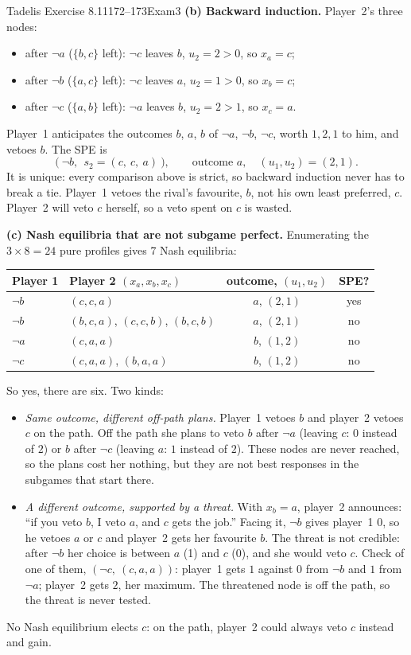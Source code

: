\begin{exsol}{Tadelis Exercise 8.11}{172--173}{Exam}{3}
\textbf{(b) Backward induction.} Player~2's three nodes:
\begin{itemize}
  \item after $\neg a$ ($\{b,c\}$ left): $\neg c$ leaves $b$, $u_2 = 2 > 0$, so $x_a = c$;
  \item after $\neg b$ ($\{a,c\}$ left): $\neg c$ leaves $a$, $u_2 = 1 > 0$, so $x_b = c$;
  \item after $\neg c$ ($\{a,b\}$ left): $\neg a$ leaves $b$, $u_2 = 2 > 1$, so $x_c = a$.
\end{itemize}
Player~1 anticipates the outcomes $b$, $a$, $b$ of $\neg a$, $\neg b$, $\neg c$, worth $1, 2, 1$ to
him, and vetoes $b$. The SPE is
\[
  \bigl(\ \neg b,\ \ s_2 = (c,\ c,\ a)\ \bigr), \qquad \text{outcome } a, \quad (u_1,u_2) = (2,1).
\]
It is unique: every comparison above is strict, so backward induction never has to break a tie. Player~1 vetoes
the rival's favourite, $b$, not his own least preferred, $c$. Player~2 will veto $c$ herself, so a veto
spent on $c$ is wasted.

\textbf{(c) Nash equilibria that are not subgame perfect.} Enumerating the $3 \times 8 = 24$ pure
profiles gives 7 Nash equilibria:
\begin{center}
\begin{tabular}{llcc}
\toprule
Player 1 & Player 2 $(x_a, x_b, x_c)$ & outcome, $(u_1,u_2)$ & SPE? \\
\midrule
$\neg b$ & $(c, c, a)$ & $a$, $(2,1)$ & yes \\
$\neg b$ & $(b, c, a)$, $(c, c, b)$, $(b, c, b)$ & $a$, $(2,1)$ & no \\
$\neg a$ & $(c, a, a)$ & $b$, $(1,2)$ & no \\
$\neg c$ & $(c, a, a)$, $(b, a, a)$ & $b$, $(1,2)$ & no \\
\bottomrule
\end{tabular}
\end{center}
So yes, there are six. Two kinds:
\begin{itemize}
  \item \emph{Same outcome, different off-path plans.} Player~1 vetoes $b$ and player~2 vetoes $c$ on
  the path. Off the path she plans to veto $b$ after $\neg a$ (leaving $c$: $0$ instead of $2$) or $b$
  after $\neg c$ (leaving $a$: $1$ instead of $2$). These nodes are never reached, so the plans cost
  her nothing, but they are not best responses in the subgames that start there.
  \item \emph{A different outcome, supported by a threat.} With $x_b = a$, player~2 announces: ``if
  you veto $b$, I veto $a$, and $c$ gets the job.'' Facing it, $\neg b$ gives player~1 $0$, so he
  vetoes $a$ or $c$ and player~2 gets her favourite $b$. The threat is not credible: after $\neg b$
  her choice is between $a$ (1) and $c$ (0), and she would veto $c$. Check of one of them,
  $(\neg c,\ (c,a,a))$: player~1 gets $1$ against $0$ from $\neg b$ and $1$ from $\neg a$;
  player~2 gets $2$, her maximum. The threatened node is off the path, so the threat is never
  tested.
\end{itemize}
No Nash equilibrium elects $c$: on the path, player~2 could always veto $c$ instead and gain.


\end{exsol}
